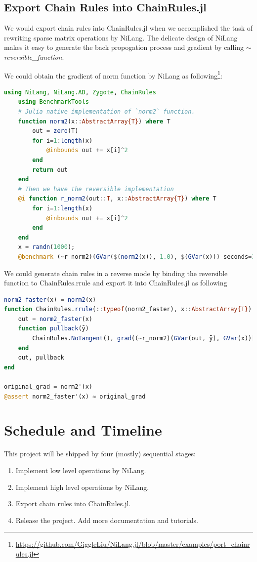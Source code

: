 \subsection{Export Chain Rules into ChainRules.jl}
We would export chain rules into ChainRules.jl when we accomplished the task of rewriting sparse matrix operations by NiLang. The delicate design of NiLang makes it easy to generate the back propogation process and gradient by calling $\sim$ \textit{reversible\_function}.
\par We could obtain the gradient of norm function by NiLang as following\footnote[1]{\url{https://github.com/GiggleLiu/NiLang.jl/blob/master/examples/port_chainrules.jl}}:
\begin{lstlisting}[language=Julia]
    using NiLang, NiLang.AD, Zygote, ChainRules
    using BenchmarkTools
    # Julia native implementation of `norm2` function.
    function norm2(x::AbstractArray{T}) where T
        out = zero(T)
        for i=1:length(x)
            @inbounds out += x[i]^2
        end
        return out
    end
    # Then we have the reversible implementation
    @i function r_norm2(out::T, x::AbstractArray{T}) where T
        for i=1:length(x)
            @inbounds out += x[i]^2
        end
    end
    x = randn(1000);
    @benchmark (~r_norm2)(GVar($(norm2(x)), 1.0), $(GVar(x))) seconds=1

\end{lstlisting}

We could generate chain rules in a reverse mode by binding the reversible function to ChainRules.rrule and export it into ChainRules.jl as following
\begin{lstlisting}[language=Julia]
norm2_faster(x) = norm2(x)
function ChainRules.rrule(::typeof(norm2_faster), x::AbstractArray{T}) where T
    out = norm2_faster(x)
    function pullback(ȳ)
        ChainRules.NoTangent(), grad((~r_norm2)(GVar(out, ȳ), GVar(x))[2])
    end
    out, pullback
end

original_grad = norm2'(x)
@assert norm2_faster'(x) ≈ original_grad
\end{lstlisting}

\section{Schedule and Timeline}

This project will be shipped by four (mostly) sequential stages:
\begin{enumerate}[(1)]
    \item Implement low level operations by NiLang.
    \item Implement high level operations by NiLang.
    \item Export chain rules into ChainRules.jl. 
    \item Release the project. Add more documentation and tutorials.
\end{enumerate}

